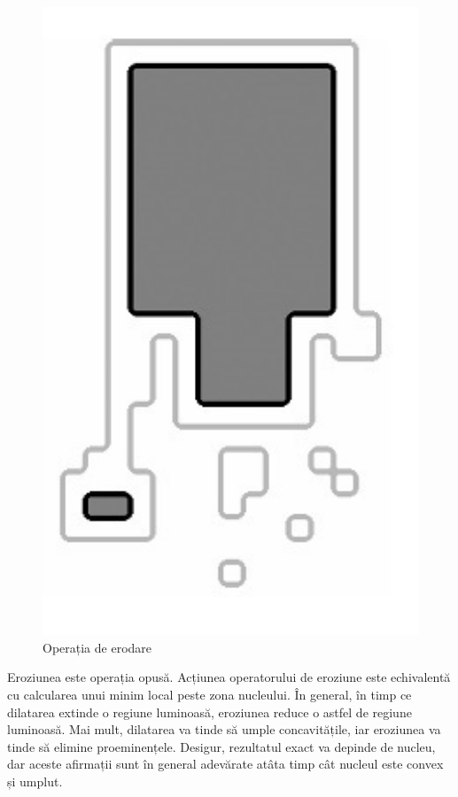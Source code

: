 \documentclass[a4paper,12pt]{report}
\begin{document}
\begin{figure}[h!]
\begin{minipage}{0.25\textwidth}
        \includegraphics[width=1\textwidth]{images/output_erode.jpg}
        \caption{Operația de erodare}
    \end{minipage}
\end{figure}
\FloatBarrier

Eroziunea este operația opusă. Acțiunea operatorului de eroziune este echivalentă cu calcularea unui minim local peste zona nucleului. În general, în timp ce dilatarea extinde o regiune luminoasă, eroziunea reduce o astfel de regiune luminoasă. Mai mult, dilatarea va tinde să umple concavitățile, iar eroziunea va tinde să elimine proeminențele. Desigur, rezultatul exact va depinde de nucleu, dar aceste afirmații sunt în general adevărate atâta timp cât nucleul este convex și umplut.
\end{document}
